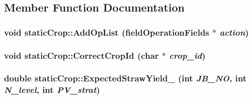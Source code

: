 \subsection{Member Function Documentation}
\hypertarget{classstatic_crop_a2496f37ddd62d263ec98d0b5868dbc5e}{
\subsubsection[{AddOpList}]{\setlength{\rightskip}{0pt plus 5cm}void staticCrop::AddOpList ({\bf fieldOperationFields} $\ast$ {\em action})}}
\label{classstatic_crop_a2496f37ddd62d263ec98d0b5868dbc5e}
\hypertarget{classstatic_crop_ad41ac9fc010354e58bdb6c40aac4a598}{
\subsubsection[{CorrectCropId}]{\setlength{\rightskip}{0pt plus 5cm}void staticCrop::CorrectCropId (char $\ast$ {\em crop\_\-id})}}
\label{classstatic_crop_ad41ac9fc010354e58bdb6c40aac4a598}
\hypertarget{classstatic_crop_a884a8335aebc5effa3fecdb75af3ca85}{
\subsubsection[{ExpectedStrawYield\_\-}]{\setlength{\rightskip}{0pt plus 5cm}double staticCrop::ExpectedStrawYield\_\- (int {\em JB\_\-NO}, \/  int {\em N\_\-level}, \/  int {\em PV\_\-strat})}}
\label{classstatic_crop_a884a8335aebc5effa3fecdb75af3ca85}


